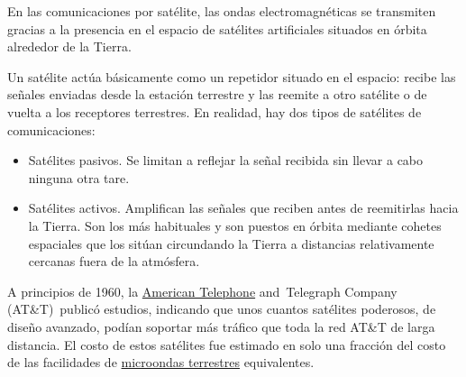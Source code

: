 \documentclass[a4paper]{article}
\begin{document}
En las comunicaciones por satélite, las ondas electromagnéticas se
transmiten gracias a la presencia en el espacio de satélites
artificiales situados en órbita alrededor de la Tierra.

Un satélite actúa básicamente como un repetidor situado en el espacio:
recibe las señales enviadas desde la estación terrestre y las reemite a
otro satélite o de vuelta a los receptores terrestres. En realidad, hay
dos tipos de satélites de comunicaciones:

\begin{itemize}
\item
  Satélites pasivos. Se limitan a reflejar la señal recibida sin llevar
  a cabo ninguna otra tare.
\item
  Satélites activos. Amplifican las señales que reciben antes de
  reemitirlas hacia la Tierra. Son los más habituales y son puestos en
  órbita mediante cohetes espaciales que los sitúan circundando la
  Tierra a distancias relativamente cercanas fuera de la atmósfera.
\end{itemize}

A principios de 1960,
la \href{https://www.ecured.cu/index.php?title=American_Telephone\&action=edit\&redlink=1}{American
Telephone} and~Telegraph Company (AT\&T)~publicó estudios, indicando que
unos cuantos satélites poderosos, de diseño avanzado, podían soportar
más tráfico que toda la red AT\&T de larga distancia. El costo de estos
satélites fue estimado en solo una fracción del costo de las facilidades
de \href{https://www.ecured.cu/index.php?title=Microondas_terrestres\&action=edit\&redlink=1}{microondas
terrestres} equivalentes.

\noindent{}
\end{document}
